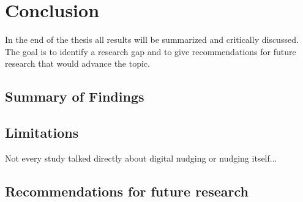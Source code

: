 \section{Conclusion}
In the end of the thesis all results will be summarized and critically discussed. The goal is to identify a research gap and to give recommendations for future research that would advance the topic.
 
 \subsection{Summary of Findings}
 
 \subsection{Limitations}
 Not every study talked directly about digital nudging or nudging itself...
 
 \subsection{Recommendations for future research}